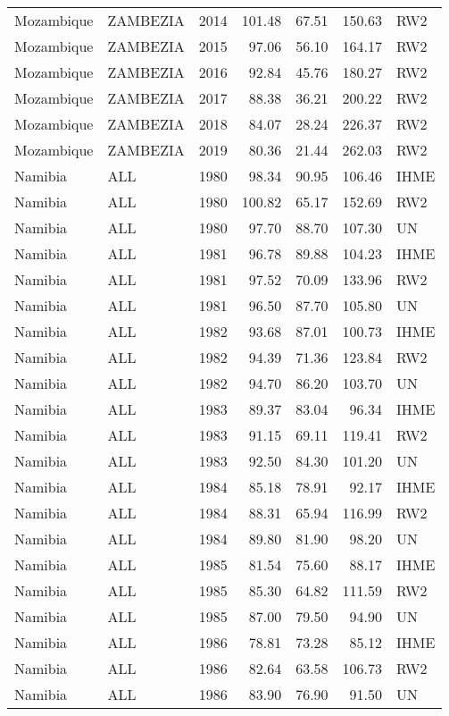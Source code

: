 \begin{longtable}{lllrrrl}
  Mozambique & ZAMBEZIA & 2014 & 101.48 & 67.51 & 150.63 & RW2 \\ 
  Mozambique & ZAMBEZIA & 2015 & 97.06 & 56.10 & 164.17 & RW2 \\ 
  Mozambique & ZAMBEZIA & 2016 & 92.84 & 45.76 & 180.27 & RW2 \\ 
  Mozambique & ZAMBEZIA & 2017 & 88.38 & 36.21 & 200.22 & RW2 \\ 
  Mozambique & ZAMBEZIA & 2018 & 84.07 & 28.24 & 226.37 & RW2 \\ 
  Mozambique & ZAMBEZIA & 2019 & 80.36 & 21.44 & 262.03 & RW2 \\ 
  Namibia & ALL & 1980 & 98.34 & 90.95 & 106.46 & IHME \\ 
  Namibia & ALL & 1980 & 100.82 & 65.17 & 152.69 & RW2 \\ 
  Namibia & ALL & 1980 & 97.70 & 88.70 & 107.30 & UN \\ 
  Namibia & ALL & 1981 & 96.78 & 89.88 & 104.23 & IHME \\ 
  Namibia & ALL & 1981 & 97.52 & 70.09 & 133.96 & RW2 \\ 
  Namibia & ALL & 1981 & 96.50 & 87.70 & 105.80 & UN \\ 
  Namibia & ALL & 1982 & 93.68 & 87.01 & 100.73 & IHME \\ 
  Namibia & ALL & 1982 & 94.39 & 71.36 & 123.84 & RW2 \\ 
  Namibia & ALL & 1982 & 94.70 & 86.20 & 103.70 & UN \\ 
  Namibia & ALL & 1983 & 89.37 & 83.04 & 96.34 & IHME \\ 
  Namibia & ALL & 1983 & 91.15 & 69.11 & 119.41 & RW2 \\ 
  Namibia & ALL & 1983 & 92.50 & 84.30 & 101.20 & UN \\ 
  Namibia & ALL & 1984 & 85.18 & 78.91 & 92.17 & IHME \\ 
  Namibia & ALL & 1984 & 88.31 & 65.94 & 116.99 & RW2 \\ 
  Namibia & ALL & 1984 & 89.80 & 81.90 & 98.20 & UN \\ 
  Namibia & ALL & 1985 & 81.54 & 75.60 & 88.17 & IHME \\ 
  Namibia & ALL & 1985 & 85.30 & 64.82 & 111.59 & RW2 \\ 
  Namibia & ALL & 1985 & 87.00 & 79.50 & 94.90 & UN \\ 
  Namibia & ALL & 1986 & 78.81 & 73.28 & 85.12 & IHME \\ 
  Namibia & ALL & 1986 & 82.64 & 63.58 & 106.73 & RW2 \\ 
  Namibia & ALL & 1986 & 83.90 & 76.90 & 91.50 & UN \\ 

\end{longtable}
